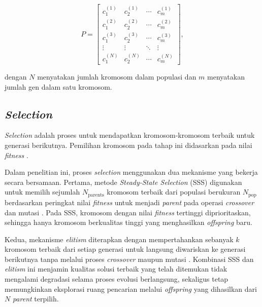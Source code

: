     \begin{equation}
    P =
    \begin{bmatrix}
    c_{1}^{(1)} & c_{2}^{(1)} & \cdots & c_{m}^{(1)} \\
    c_{1}^{(2)} & c_{2}^{(2)} & \cdots & c_{m}^{(2)} \\
    c_{1}^{(3)} & c_{2}^{(3)} & \cdots & c_{m}^{(3)} \\
    \vdots      & \vdots      & \ddots & \vdots      \\
    c_{1}^{(N)} & c_{2}^{(N)} & \cdots & c_{m}^{(N)}
    \end{bmatrix},
    \label{eq:population_matrix}
    \end{equation}

    dengan $N$ menyatakan jumlah kromosom dalam populasi dan $m$ menyatakan jumlah gen dalam satu kromosom.

    
    \subsection{\textit{Selection}}

    \textit{Selection} adalah proses untuk mendapatkan kromosom-kromosom terbaik untuk generasi berikutnya. Pemilihan kromosom pada tahap ini didasarkan pada nilai \textit{fitness} \cite{Fanggidae2015}. 
    
    Dalam penelitian ini, proses \textit{selection} menggunakan dua 
    mekanisme yang bekerja secara bersamaan. Pertama, metode 
    \textit{Steady-State Selection} (SSS) digunakan untuk memilih 
    sejumlah $N_{\text{parents}}$ kromosom terbaik dari populasi 
    berukuran $N_{\text{pop}}$ berdasarkan peringkat nilai 
    \textit{fitness} untuk menjadi \textit{parent} pada operasi 
    \textit{crossover} dan mutasi \cite{mahmudy2013algoritma}. 
    Pada SSS, kromosom dengan nilai \textit{fitness} tertinggi 
    diprioritaskan, sehingga hanya kromosom berkualitas tinggi 
    yang menghasilkan \textit{offspring} baru.
    
    Kedua, mekanisme \textit{elitism} diterapkan dengan 
    mempertahankan sebanyak $k$ kromosom terbaik  dari setiap generasi untuk langsung diwariskan ke generasi berikutnya tanpa melalui 
    proses \textit{crossover} maupun mutasi \cite{mahmudy2013algoritma}. 
    Kombinasi SSS dan \textit{elitism} ini menjamin  kualitas solusi terbaik yang telah ditemukan tidak mengalami degradasi 
    selama proses evolusi berlangsung, sekaligus tetap memungkinkan 
    eksplorasi ruang pencarian melalui \textit{offspring} yang 
    dihasilkan dari $N$ \textit{parent} terpilih.
    
